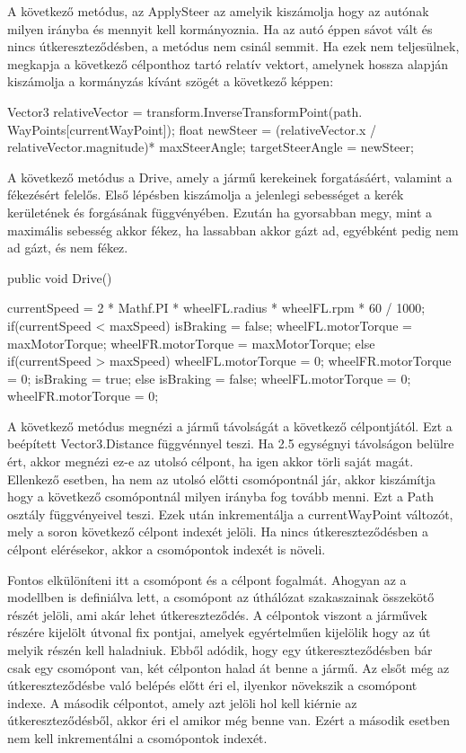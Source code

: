 A következő metódus, az ApplySteer az amelyik kiszámolja hogy az autónak milyen irányba és mennyit kell kormányoznia. Ha az autó éppen sávot vált és nincs útkereszteződésben, a metódus nem csinál semmit. Ha ezek nem teljesülnek, megkapja a következő célponthoz tartó relatív vektort, amelynek hossza alapján kiszámolja a kormányzás kívánt szögét a következő képpen:
\begin{cpp}
Vector3 relativeVector = transform.InverseTransformPoint(path.
WayPoints[currentWayPoint]);
float newSteer = (relativeVector.x / relativeVector.magnitude)*
maxSteerAngle;
targetSteerAngle = newSteer;
\end{cpp}

A következő metódus a Drive, amely a jármű kerekeinek forgatásáért, valamint a fékezésért felelős. Első lépésben kiszámolja a jelenlegi sebességet a kerék kerületének és forgásának függvényében. Ezután ha gyorsabban megy, mint a maximális sebesség akkor fékez, ha lassabban akkor gázt ad, egyébként pedig nem ad gázt, és nem fékez.
\begin{cpp}
public void Drive()
    {
        currentSpeed = 2 * Mathf.PI * wheelFL.radius *
        wheelFL.rpm * 60 / 1000;
        if(currentSpeed < maxSpeed)
        {
            isBraking = false;
            wheelFL.motorTorque = maxMotorTorque;
            wheelFR.motorTorque = maxMotorTorque;
        }
        else if(currentSpeed > maxSpeed)
        {
            wheelFL.motorTorque = 0;
            wheelFR.motorTorque = 0;
            isBraking = true;
        }
        else
        {
            isBraking = false;
            wheelFL.motorTorque = 0;
            wheelFR.motorTorque = 0;
        }
        
    }
\end{cpp}

A következő metódus megnézi a jármű távolságát a következő célpontjától. Ezt a beépített Vector3.Distance függvénnyel teszi. Ha 2.5 egységnyi távolságon belülre ért, akkor megnézi ez-e az utolsó célpont, ha igen akkor törli saját magát. Ellenkező esetben, ha nem az utolsó előtti csomópontnál jár, akkor kiszámítja hogy a következő csomópontnál milyen irányba fog tovább menni. Ezt a Path osztály függvényeivel teszi. Ezek után inkrementálja a currentWayPoint változót, mely a soron következő célpont indexét jelöli. Ha nincs útkereszteződésben a célpont elérésekor, akkor a csomópontok indexét is növeli.

Fontos elkülöníteni itt a csomópont és a célpont fogalmát. Ahogyan az a modellben is definiálva lett, a csomópont az úthálózat szakaszainak összekötő részét jelöli, ami akár lehet útkereszteződés. A célpontok viszont a járművek részére kijelölt útvonal fix pontjai, amelyek egyértelműen kijelölik hogy az út melyik részén kell haladniuk. Ebből adódik, hogy egy útkereszteződésben bár csak egy csomópont van, két célponton halad át benne a jármű. Az elsőt még az útkereszteződésbe való belépés előtt éri el, ilyenkor növekszik a csomópont indexe. A második célpontot, amely azt jelöli hol kell kiérnie az útkereszteződésből, akkor éri el amikor még benne van. Ezért a második esetben nem kell inkrementálni a csomópontok indexét.

